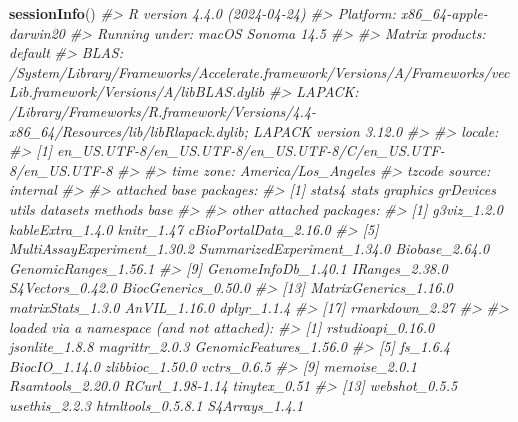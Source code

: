 \documentclass[
]{article}
\newenvironment{Shaded}{\begin{snugshade}}{\end{snugshade}}
\newcommand{\CommentTok}[1]{\textcolor[rgb]{0.56,0.35,0.01}{\textit{#1}}}
\newcommand{\FunctionTok}[1]{\textcolor[rgb]{0.13,0.29,0.53}{\textbf{#1}}}
\newcommand{\NormalTok}[1]{#1}
\begin{document}
\begin{Shaded}
\begin{Highlighting}[]
\FunctionTok{sessionInfo}\NormalTok{()}
\CommentTok{\#\textgreater{} R version 4.4.0 (2024{-}04{-}24)}
\CommentTok{\#\textgreater{} Platform: x86\_64{-}apple{-}darwin20}
\CommentTok{\#\textgreater{} Running under: macOS Sonoma 14.5}
\CommentTok{\#\textgreater{} }
\CommentTok{\#\textgreater{} Matrix products: default}
\CommentTok{\#\textgreater{} BLAS:   /System/Library/Frameworks/Accelerate.framework/Versions/A/Frameworks/vecLib.framework/Versions/A/libBLAS.dylib }
\CommentTok{\#\textgreater{} LAPACK: /Library/Frameworks/R.framework/Versions/4.4{-}x86\_64/Resources/lib/libRlapack.dylib;  LAPACK version 3.12.0}
\CommentTok{\#\textgreater{} }
\CommentTok{\#\textgreater{} locale:}
\CommentTok{\#\textgreater{} [1] en\_US.UTF{-}8/en\_US.UTF{-}8/en\_US.UTF{-}8/C/en\_US.UTF{-}8/en\_US.UTF{-}8}
\CommentTok{\#\textgreater{} }
\CommentTok{\#\textgreater{} time zone: America/Los\_Angeles}
\CommentTok{\#\textgreater{} tzcode source: internal}
\CommentTok{\#\textgreater{} }
\CommentTok{\#\textgreater{} attached base packages:}
\CommentTok{\#\textgreater{} [1] stats4    stats     graphics  grDevices utils     datasets  methods   base     }
\CommentTok{\#\textgreater{} }
\CommentTok{\#\textgreater{} other attached packages:}
\CommentTok{\#\textgreater{}  [1] g3viz\_1.2.0                 kableExtra\_1.4.0            knitr\_1.47                  cBioPortalData\_2.16.0      }
\CommentTok{\#\textgreater{}  [5] MultiAssayExperiment\_1.30.2 SummarizedExperiment\_1.34.0 Biobase\_2.64.0              GenomicRanges\_1.56.1       }
\CommentTok{\#\textgreater{}  [9] GenomeInfoDb\_1.40.1         IRanges\_2.38.0              S4Vectors\_0.42.0            BiocGenerics\_0.50.0        }
\CommentTok{\#\textgreater{} [13] MatrixGenerics\_1.16.0       matrixStats\_1.3.0           AnVIL\_1.16.0                dplyr\_1.1.4                }
\CommentTok{\#\textgreater{} [17] rmarkdown\_2.27             }
\CommentTok{\#\textgreater{} }
\CommentTok{\#\textgreater{} loaded via a namespace (and not attached):}
\CommentTok{\#\textgreater{}   [1] rstudioapi\_0.16.0         jsonlite\_1.8.8            magrittr\_2.0.3            GenomicFeatures\_1.56.0   }
\CommentTok{\#\textgreater{}   [5] fs\_1.6.4                  BiocIO\_1.14.0             zlibbioc\_1.50.0           vctrs\_0.6.5              }
\CommentTok{\#\textgreater{}   [9] memoise\_2.0.1             Rsamtools\_2.20.0          RCurl\_1.98{-}1.14           tinytex\_0.51             }
\CommentTok{\#\textgreater{}  [13] webshot\_0.5.5             usethis\_2.2.3             htmltools\_0.5.8.1         S4Arrays\_1.4.1           }

\end{Highlighting}
\end{Shaded}
\end{document}
